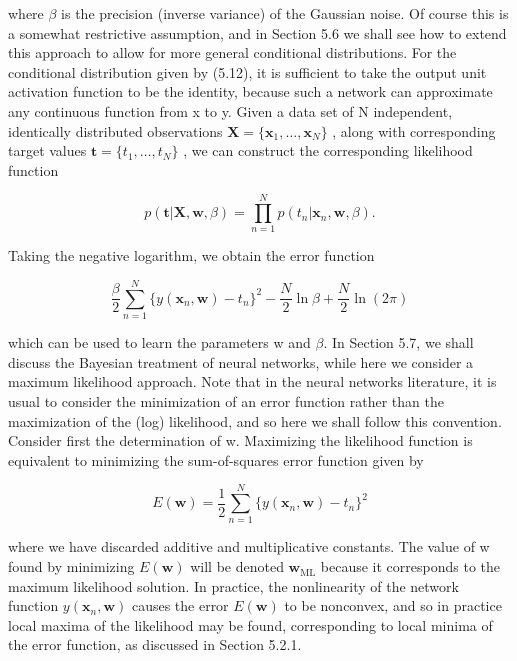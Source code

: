 \documentclass[
  10
]{article}
\begin{document}
where \(\beta\) is the precision (inverse variance) of the Gaussian
noise. Of course this is a somewhat restrictive assumption, and in
Section 5.6 we shall see how to extend this approach to allow for more
general conditional distributions. For the conditional distribution
given by (5.12), it is sufficient to take the output unit activation
function to be the identity, because such a network can approximate any
continuous function from x to y. Given a data set of N independent,
identically distributed observations
\(\mathbf { X } = \{ \mathbf { x } _ { 1 } , \ldots , \mathbf { x } _ { N } \}\)
, along with corresponding target values
\(\mathbf { t } = \{ t _ { 1 } , \ldots , t _ { N } \}\) , we can
construct the corresponding likelihood function

\[
p (\mathbf {t} | \mathbf {X}, \mathbf {w}, \beta) = \prod_ {n = 1} ^ {N} p (t _ {n} | \mathbf {x} _ {n}, \mathbf {w}, \beta).
\]

Taking the negative logarithm, we obtain the error function

\[
\frac {\beta}{2} \sum_ {n = 1} ^ {N} \{y (\mathbf {x} _ {n}, \mathbf {w}) - t _ {n} \} ^ {2} - \frac {N}{2} \ln \beta + \frac {N}{2} \ln (2 \pi)\tag{5.13}
\]

which can be used to learn the parameters w and \(\beta .\) In Section
5.7, we shall discuss the Bayesian treatment of neural networks, while
here we consider a maximum likelihood approach. Note that in the neural
networks literature, it is usual to consider the minimization of an
error function rather than the maximization of the (log) likelihood, and
so here we shall follow this convention. Consider first the
determination of w. Maximizing the likelihood function is equivalent to
minimizing the sum-of-squares error function given by

\[
E (\mathbf {w}) = \frac {1}{2} \sum_ {n = 1} ^ {N} \{y (\mathbf {x} _ {n}, \mathbf {w}) - t _ {n} \} ^ {2}\tag{5.14}
\]

where we have discarded additive and multiplicative constants. The value
of w found by minimizing \(E ( \mathbf { w } )\) will be denoted
\(\mathbf { w } _ { \mathrm { M L } }\) because it corresponds to the
maximum likelihood solution. In practice, the nonlinearity of the
network function \(y ( \mathbf { x } _ { n } , \mathbf { w } )\) causes
the error \(E ( \mathbf { w } )\) to be nonconvex, and so in practice
local maxima of the likelihood may be found, corresponding to local
minima of the error function, as discussed in Section 5.2.1.
\end{document}
